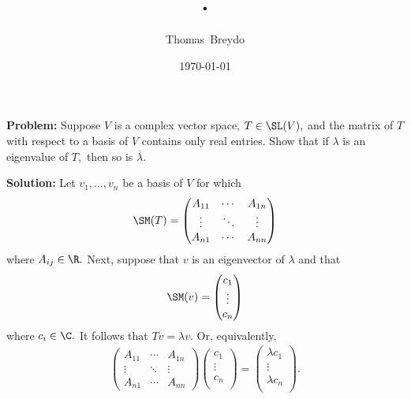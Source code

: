 \documentclass{amsart}
\title{\pagenum.\probnum}
\author{Thomas\ Breydo}
\date{\today}
\begin{document}
\maketitle

\textbf{Problem:} Suppose $V$ is a complex vector space,
$T\in\SL(V),$ and the matrix of $T$ with respect
to a basis of $V$ contains only real entries. Show that if $\lambda$
is an eigenvalue of $T,$ then so is $\overline\lambda.$

\vspace{0.5in}

\newcommand{\basis}{v_1,\ldots,v_n}

\textbf{Solution:} Let $\basis$ be a basis of $V$ for which
\begin{align*}
    \SM(T)=\begin{pmatrix}
        A_{11} & \cdots & A_{1n} \\
        \vdots & \ddots &\vdots \\
        A_{n1}    &\cdots & A_{nn}
    \end{pmatrix}
\end{align*}
where $A_{ij}\in\R.$ Next, suppose that $v$ is an eigenvector of $\lambda$ and that
\begin{align*}
    \SM(v)=\begin{pmatrix}
        c_1\\
        \vdots\\
        c_n\\
    \end{pmatrix}
\end{align*}
where $c_i\in\C.$ It follows that $Tv=\lambda v.$ Or, equivalently,
\begin{align*}
    \begin{pmatrix}
        A_{11} & \cdots & A_{1n} \\
        \vdots & \ddots &\vdots \\
        A_{n1}    &\cdots & A_{nn}
    \end{pmatrix}
    \begin{pmatrix}
        c_1\\
        \vdots\\
        c_n\\
    \end{pmatrix}
    =\begin{pmatrix}
        \lambda c_1\\
        \vdots\\
        \lambda c_n\\
    \end{pmatrix}.
\end{align*}
\end{document}
